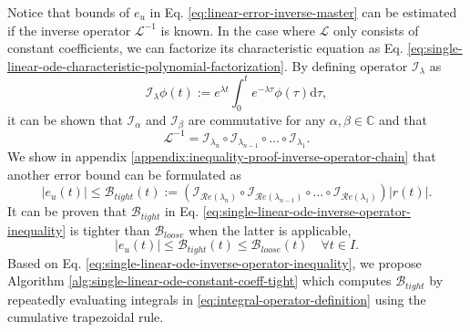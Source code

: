 \documentclass{article}
\newcommand{\Err}{e}
\newcommand{\Bound}{\mathcal{B}}
\renewcommand{\L}{\mathcal{L}}
\newcommand{\I}{\mathcal{I}}
\renewcommand{\Re}[1]{\mathcal{R}e\left(#1\right)}
\begin{document}
    Notice that bounds of $\Err_u$ in Eq. \ref{eq:linear-error-inverse-master} can be estimated if the inverse operator $\L^{-1}$ is known. 
    In the case where $\L$ only consists of constant coefficients, we can factorize its characteristic equation as Eq. \ref{eq:single-linear-ode-characteristic-polynomial-factorization}.
    By defining operator $\I_{\lambda}$ as 
    \begin{equation} \label{eq:integral-operator-definition}
        \I_\lambda \phi(t) := e^{{\lambda} t} \int_{0}^{t} e^{-{\lambda} \tau} \phi(\tau) \mathrm{d}\tau,
    \end{equation}
    it can be shown that $\I_\alpha$ and $\I_\beta$ are commutative for any $\alpha, \beta \in \mathbb{C}$ and that
    \begin{equation}
        \L^{-1} = \I_{\lambda_{n}} \circ \I_{\lambda_{n-1}} \circ \dots \circ \I_{\lambda_1}.
    \end{equation}
    We show in appendix \ref{appendix:inequality-proof-inverse-operator-chain} that another error bound can be formulated as
    \begin{equation} \label{eq:single-linear-ode-inverse-operator-inequality}
        |\Err_u(t)| \leq \Bound_{tight}(t) := \left(\I_{\Re{\lambda_{n}}} \circ \I_{\Re{\lambda_{n-1}}} \circ \dots \circ \I_{\Re{\lambda_1}}\right) |r(t)|.
    \end{equation}
    It can be proven that $\Bound_{tight}$ in Eq. \ref{eq:single-linear-ode-inverse-operator-inequality} is tighter than $\Bound_{loose}$ when the latter is applicable,
    \begin{equation}
        \left|\Err_u(t)\right| \leq \Bound_{tight}(t) \leq \Bound_{loose}(t) \quad \forall t \in I.
    \end{equation}
    Based on Eq. \ref{eq:single-linear-ode-inverse-operator-inequality}, we propose Algorithm \ref{alg:single-linear-ode-constant-coeff-tight} which computes $\Bound_{tight}$ by repeatedly evaluating integrals in \ref{eq:integral-operator-definition} using the cumulative trapezoidal rule.
\end{document}
